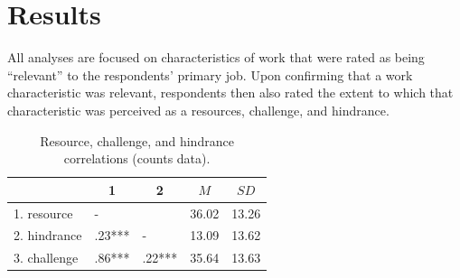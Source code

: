 \documentclass[
  man]{apa6}
\begin{document}
\hypertarget{results}{%
\section{Results}\label{results}}

All analyses are focused on characteristics of work that were rated as being ``relevant'' to the respondents' primary job. Upon confirming that a work characteristic was relevant, respondents then also rated the extent to which that characteristic was perceived as a resources, challenge, and hindrance.

\begin{table}[tbp]

\begin{center}
\begin{threeparttable}

\caption{\label{tab:cortab}Resource, challenge, and hindrance correlations (counts data).}

\begin{tabular}{lllll}
\toprule
 & \multicolumn{1}{c}{1} & \multicolumn{1}{c}{2} & \multicolumn{1}{c}{$M$} & \multicolumn{1}{c}{$SD$}\\
\midrule
1. resource & - &  & 36.02 & 13.26\\
2. hindrance & .23*** & - & 13.09 & 13.62\\
3. challenge & .86*** & .22*** & 35.64 & 13.63\\
\bottomrule
\end{tabular}

\end{threeparttable}
\end{center}

\end{table}
\end{document}
